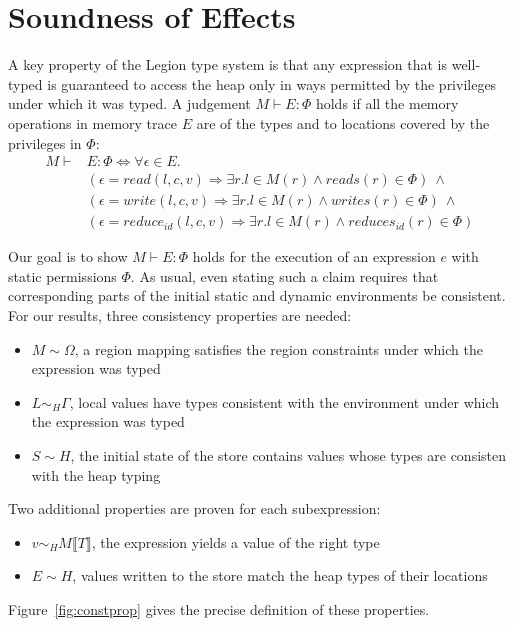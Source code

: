 \section{Soundness of Effects}
\label{sec:soundness}

A key property of the Legion type system is that any expression that is well-typed is
guaranteed to access the heap only in ways permitted by the privileges under which it was typed.
A judgement $M \vdash E : \Phi$ holds if all the memory operations in memory trace $E$ are of the types and
to locations covered by the privileges in $\Phi$:
\[ 
\begin{array}{rl}
M \vdash & E : \Phi \Leftrightarrow \forall \epsilon \in E. \\
& (\epsilon = read(l, c, v) \Rightarrow \exists r. l \in M(r) \wedge reads(r) \in \Phi)\ \wedge \\
& (\epsilon = write(l, c, v) \Rightarrow \exists r. l \in M(r) \wedge writes(r) \in \Phi)\ \wedge \\
& (\epsilon = reduce_{id}(l, c, v) \Rightarrow \exists r. l \in M(r) \wedge reduces_{id}(r) \in \Phi)
\end{array}
\]

Our goal is to show $M \vdash E : \Phi$ holds for the execution of an expression $e$ with static permissions $\Phi$.
As usual, even stating such a claim requires that corresponding parts of the initial static and dynamic environments be consistent.
For our results, three consistency properties are needed:
\begin{itemize}
\item $M \sim \Omega$, a region mapping satisfies the region constraints under which the expression was typed
\item $L \sim_H \Gamma$, local values have types consistent with the environment under which the expression was typed
\item $S \sim H$, the initial state of the store contains values whose types are consisten with the heap typing
\end{itemize}

Two additional properties are proven for each subexpression:
\begin{itemize}
\item $v \sim_H M \llbracket T \rrbracket$, the expression yields a value of the right type
\item $E \sim H$, values written to the store match the heap types of their locations
\end{itemize}
Figure~\ref{fig:constprop} gives the precise definition of these properties.

